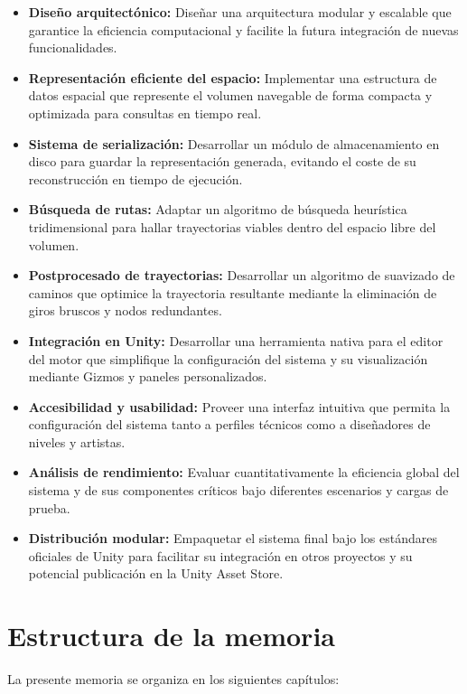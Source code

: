 \begin{itemize}
    \item \textbf{Diseño arquitectónico:} Diseñar una arquitectura modular y escalable que garantice la eficiencia computacional y facilite la futura integración de nuevas funcionalidades.
    \item \textbf{Representación eficiente del espacio:} Implementar una estructura de datos espacial que represente el volumen navegable de forma compacta y optimizada para consultas en tiempo real.
    \item \textbf{Sistema de serialización:} Desarrollar un módulo de almacenamiento en disco para guardar la representación generada, evitando el coste de su reconstrucción en tiempo de ejecución.
    \item \textbf{Búsqueda de rutas:} Adaptar un algoritmo de búsqueda heurística tridimensional para hallar trayectorias viables dentro del espacio libre del volumen.
    \item \textbf{Postprocesado de trayectorias:} Desarrollar un algoritmo de suavizado de caminos que optimice la trayectoria resultante mediante la eliminación de giros bruscos y nodos redundantes.
    \item \textbf{Integración en Unity:} Desarrollar una herramienta nativa para el editor del motor que simplifique la configuración del sistema y su visualización mediante Gizmos y paneles personalizados.
    \item \textbf{Accesibilidad y usabilidad:} Proveer una interfaz intuitiva que permita la configuración del sistema tanto a perfiles técnicos como a diseñadores de niveles y artistas.
    \item \textbf{Análisis de rendimiento:} Evaluar cuantitativamente la eficiencia global del sistema y de sus componentes críticos bajo diferentes escenarios y cargas de prueba.
    \item \textbf{Distribución modular:} Empaquetar el sistema final bajo los estándares oficiales de Unity para facilitar su integración en otros proyectos y su potencial publicación en la Unity Asset Store.
\end{itemize}

\section{Estructura de la memoria}

La presente memoria se organiza en los siguientes capítulos:

